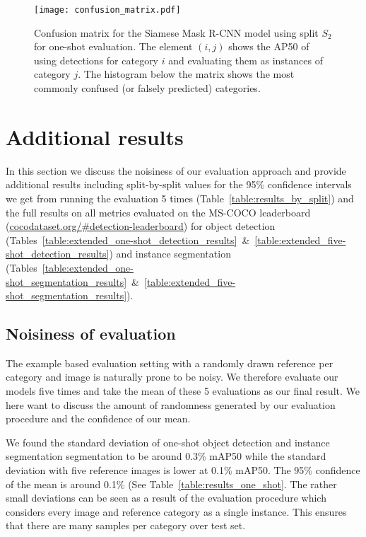 \documentclass{article}
\newcommand{\coco}{MS-COCO\xspace}
\begin{document}
\begin{figure}[t!]
    \centering
    \texttt{[image: confusion\_matrix.pdf]}
    \caption{Confusion matrix for the Siamese Mask R-CNN model using split $S_2$ for one-shot evaluation. The element $(i,j)$ shows the AP50 of using detections for category $i$ and evaluating them as instances of category $j$. The histogram below the matrix shows the most commonly confused (or falsely predicted) categories.}
    \label{fig:confusion_matrix}
\end{figure}



\section{Additional results}
\label{appendix:additional_results}

In this section we discuss the noisiness of our evaluation approach and provide additional results including split-by-split values for the 95\% confidence intervals we get from running the evaluation 5 times (Table~\ref{table:results_by_split}) and the full results on all metrics evaluated on the \coco leaderboard (\url{cocodataset.org/\#detection-leaderboard}) for object detection (Tables~\ref{table:extended_one-shot_detection_results}~\&~\ref{table:extended_five-shot_detection_results}) and instance segmentation (Tables~\ref{table:extended_one-shot_segmentation_results}~\&~\ref{table:extended_five-shot_segmentation_results}).

\subsection{Noisiness of evaluation}

The example based evaluation setting with a randomly drawn reference per category and image is naturally prone to be noisy. We therefore evaluate our models five times and take the mean of these 5 evaluations as our final result. We here want to discuss the amount of randomness generated by our evaluation procedure and the confidence of our mean.

We found the standard deviation of one-shot object detection and instance segmentation segmentation to be around 0.3\% mAP50 while the standard deviation with five reference images is lower at 0.1\% mAP50. The 95\% confidence of the mean is around 0.1\% (See Table~\ref{table:results_one_shot}. The rather small deviations can be seen as a result of the evaluation procedure which considers every image and reference category as a single instance. This ensures that there are many samples per category over test set.
\end{document}
